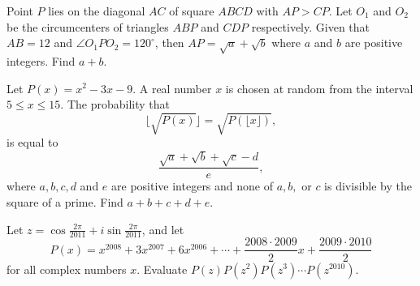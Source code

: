 \documentclass[11pt]{article}
\theoremstyle{definition}
\begin{document}
%	








\begin{question}[name={2011 AIME II, \href{https://artofproblemsolving.com/community/c4p2224408}{Problem 13}}]
	Point $P$ lies on the diagonal $AC$ of square $ABCD$ with $AP>CP$. Let $O_1$ and $O_2$ be the circumcenters of triangles $ABP$ and $CDP$ respectively. Given that $AB=12$ and $\angle O_1 P O_2 = 120^\circ$, then $AP=\sqrt{a}+\sqrt{b}$ where $a$ and $b$ are positive integers. Find $a+b$.
\end{question}


%	













\begin{question}[name={2011 AIME II, \href{https://artofproblemsolving.com/community/c4p2224410}{Problem 15}}]
	Let $P(x)=x^2-3x-9$. A real number $x$ is chosen at random from the interval $5\leq x \leq 15$. The probability that $$\lfloor \sqrt{P(x)} \rfloor = \sqrt{P(\lfloor x \rfloor )},$$ is equal to $$\dfrac{\sqrt{a}+\sqrt{b}+\sqrt{c}-d}{e},$$ where $a,b,c,d$ and $e$ are positive integers and none of $a,b,$ or $c$ is divisible by the square of a prime. Find $a+b+c+d+e$.
\end{question}


%	







\begin{question}[name={2011 HMMT, Algebra, \href{https://artofproblemsolving.com/community/c129h520361p2930895}{Problem 8}}]
	Let $z = \cos \frac{2\pi}{2011} + i\sin \frac{2\pi}{2011}$, and let\[ P(x) = x^{2008} + 3x^{2007} + 6x^{2006} + \cdots + \frac{2008 \cdot 2009}{2} x + \frac{2009 \cdot 2010}{2} \]for all complex numbers $x$. Evaluate $P(z)P(z^2)P(z^3) \cdots P(z^{2010})$.
\end{question}
\end{document}
